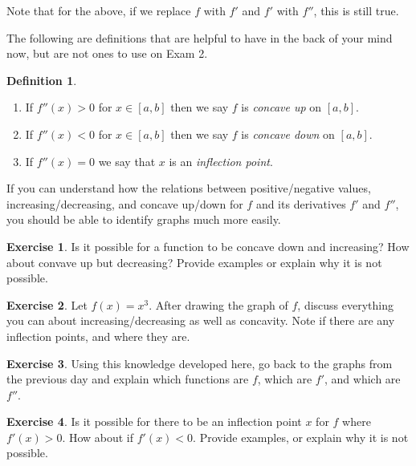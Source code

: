\documentclass[leqno]{article}
\theoremstyle{definition}
\newtheorem{definition}{Definition}[section]
\newtheorem{exercise}{Exercise}[section]
\theoremstyle{remark}
\theoremstyle{theorem}
\begin{document}
Note that for the above, if we replace $f$ with $f'$ and $f'$ with $f''$, this is still true. 


The following are definitions that are helpful to have in the back of your mind now, but are not ones to use on Exam 2.
\begin{definition}
\begin{enumerate}[1.]
\item If $f''(x)>0$ for $x\in [a,b]$ then we say $f$ is \emph{concave up} on $[a,b]$.
\item If $f''(x)<0$ for $x\in [a,b]$ then we say $f$ is \emph{concave down} on $[a,b]$.
\item If $f''(x)=0$ we say that $x$ is an \emph{inflection point}.
\end{enumerate}
\end{definition}

If you can understand how the relations between positive/negative values, increasing/decreasing, and concave up/down for $f$ and its derivatives $f'$ and $f''$, you should be able to identify graphs much more easily.

\begin{exercise}
Is it possible for a function to be concave down and increasing? How about convave up but decreasing? Provide examples or explain why it is not possible.
\vspace*{5cm}
\end{exercise}

\begin{exercise}
Let $f(x)=x^3$. After drawing the graph of $f$, discuss everything you can about increasing/decreasing as well as concavity.  Note if there are any inflection points, and where they are.
\vspace*{7cm}
\end{exercise}

\begin{exercise}
Using this knowledge developed here, go back to the graphs from the previous day and explain which functions are $f$, which are $f'$, and which are $f''$.
\end{exercise}

\begin{exercise}
Is it possible for there to be an inflection point $x$ for $f$ where $f'(x)>0$.  How about if $f'(x)<0$.  Provide examples, or explain why it is not possible.
\vspace*{5cm}
\end{exercise}

\pagebreak
\end{document}
